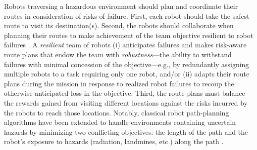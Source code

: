\documentclass[fleqn,10pt,lineno]{wlpeerj}
\begin{document}
Robots traversing a hazardous environment should plan and coordinate their routes in consideration of risks of failure.
First, each robot should take the safest route to visit its destination(s). 
Second, the robots should collaborate when planning their routes to make achievement of the team objective resilient to robot failures \cite{zhou2021multi}. 
A \emph{resilient} team of robots \cite{prorok2021beyond}
(i) anticipates failures and makes risk-aware route plans that endow the team with \emph{robustness}---the ability to withstand failures with minimal concession of the objective---e.g., by redundantly assigning multiple robots to a task requiring only one robot,
and/or
(ii) adapts their route plans during the mission in response to realized robot failures to recoup the otherwise anticipated loss in the objective. 
Third, the route plans must balance the rewards gained from visiting different locations against the risks incurred by the robots to reach those locations.
Notably, classical robot path-planning algorithms have been extended to handle environments containing uncertain hazards by minimizing two conflicting objectives: the length of the path and the robot's exposure to hazards (radiation, landmines, etc.) along the path \cite{zhang2023multi,zhang2013robot,cui2023improved}.
\end{document}
